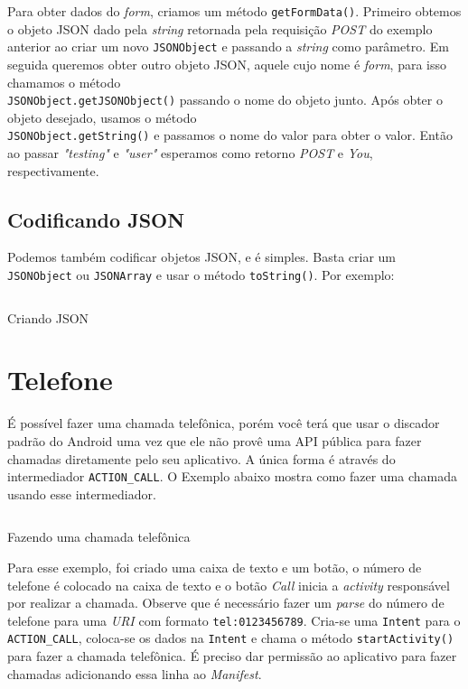 \documentclass[a4paper,12pt,brazil,oneside]{book}
\begin{document}
		Para obter dados do \emph{form}, criamos um método \texttt{getFormData()}. Primeiro obtemos o objeto JSON dado pela \emph{string} retornada pela requisição \emph{POST} do exemplo anterior ao criar um novo \texttt{JSONObject} e passando a \emph{string} como parâmetro. Em seguida queremos obter outro objeto JSON, aquele cujo nome é \emph{form}, para isso chamamos o método \\ \texttt{JSONObject.getJSONObject()} passando o nome do objeto junto. Após obter o objeto desejado, usamos o método \\ \texttt{JSONObject.getString()} e passamos o nome do valor para obter o valor. Então ao passar \emph{"testing"} e \emph{"user"} esperamos como retorno \emph{POST} e \emph{You}, respectivamente. 

		\subsection{Codificando JSON}

		Podemos também codificar objetos JSON, e é simples. Basta criar um \texttt{JSONObject} ou \texttt{JSONArray} e usar o método \texttt{toString()}. Por exemplo:
	
		\begin{listing}[H]
		\inputminted[linenos=true,fontsize=\small,frame=lines, framesep=2mm, tabsize=2,numbersep=5pt]{java}{src/api/comm/writejson.java}
		\caption{Criando JSON}
		\label{code:jsonparser2}
		\end{listing} 


	\section{Telefone}
		
		É possível fazer uma chamada telefônica, porém você terá que usar o discador padrão do Android uma vez que ele não provê uma API pública para fazer chamadas diretamente pelo seu aplicativo. A única forma é através do intermediador \texttt{ACTION\_CALL}. O Exemplo abaixo mostra como fazer uma chamada usando esse intermediador.

		\begin{listing}[H]
		\inputminted[linenos=true,fontsize=\small,frame=lines, framesep=2mm, tabsize=2,numbersep=5pt]{java}{src/api/comm/phonecall.java}
		\caption{Fazendo uma chamada telefônica}
		\label{code:phonecall}
		\end{listing} 

		Para esse exemplo, foi criado uma caixa de texto e um botão, o número de telefone é colocado na caixa de texto e o botão \emph{Call} inicia a \emph{activity} responsável por realizar a chamada. Observe que é necessário fazer um \emph{parse} do número de telefone para uma \emph{URI} com formato \texttt{tel:0123456789}. Cria-se uma \texttt{Intent} para o \texttt{ACTION\_CALL}, coloca-se os dados na \texttt{Intent} e chama o método \texttt{startActivity()} para fazer a chamada telefônica. É preciso dar permissão ao aplicativo para fazer chamadas adicionando essa linha ao \emph{Manifest}.
	
\end{document}
